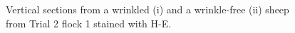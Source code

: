 %

\begin{figure}[p]
\centering
  \caption{Vertical sections from a wrinkled (i) and a wrinkle-free (ii)  sheep from Trial 2 flock 1 stained with H-E. }
\vfill
  \label{fig:trial24xhe}
\end{figure}

%

